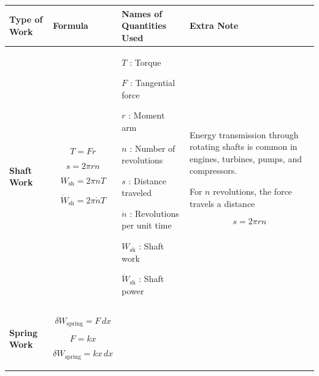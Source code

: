 \documentclass[12pt]{article}
\begin{document}
\begin{center}
\vspace*{-1cm}
\hspace*{-2cm}
\renewcommand{\arraystretch}{1.5}
\begin{tabular}{|p{3.2cm}|p{5.2cm}|p{5.0cm}|p{5.0cm}|}
\hline
\textbf{Type of Work} &
\textbf{Formula} &
\textbf{Names of Quantities Used} &
\textbf{Extra Note} \\
\hline

\textbf{Shaft Work}
&
\begin{equation*}
T=Fr
\end{equation*}

\begin{equation*}
s=2\pi rn
\end{equation*}

\begin{equation*}
W_{\mathrm{sh}}=2\pi nT
\end{equation*}

\begin{equation*}
\dot{W}_{\mathrm{sh}}=2\pi\dot{n}T
\end{equation*}
&
$T$ : Torque

$F$ : Tangential force

$r$ : Moment arm

$n$ : Number of revolutions

$s$ : Distance traveled

$\dot{n}$ : Revolutions per unit time

$W_{\mathrm{sh}}$ : Shaft work

$\dot{W}_{\mathrm{sh}}$ : Shaft power
&
Energy transmission through rotating shafts is common in engines, turbines, pumps, and compressors.

For $n$ revolutions, the force travels a distance

\begin{equation*}
s=2\pi rn
\end{equation*}
\\
\hline

\textbf{Spring Work}
&
\begin{equation*}
\delta W_{\mathrm{spring}}=F\,dx
\end{equation*}

\begin{equation*}
F=kx
\end{equation*}

\begin{equation*}
\delta W_{\mathrm{spring}}=kx\,dx
\end{equation*}


\end{tabular}
\end{center}
\end{document}
